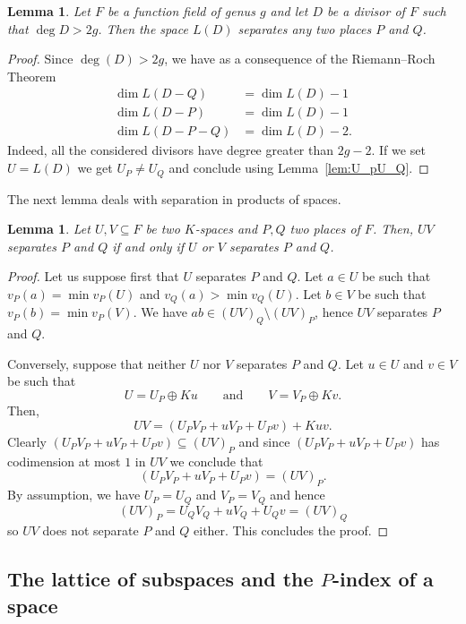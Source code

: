 \documentclass[10pt]{amsart}
\newtheorem{lemm}[theo]{Lemma}
\theoremstyle{definition}
\theoremstyle{remark}
\begin{document}
\begin{lemm}\label{lem:L(D)sep}
Let $F$ be a function field of genus $g$ and let $D$ be a divisor of $F$ such that $\deg D > 2g$. Then the space $L(D)$ separates any two places $P$ and $Q$.
\end{lemm}

\begin{proof}
Since $\deg (D) > 2g$, we have as a consequence of the Riemann--Roch Theorem
\begin{align*}
\dim L(D-Q) &= \dim L(D)-1\\
\dim L(D-P) &= \dim L(D)-1\\
\dim L(D-P-Q) &= \dim L(D)-2.
\end{align*}
Indeed, all the considered divisors have degree greater than $2g-2$. If we set $U= L(D)$ we get $U_P \neq U_Q$ and conclude using Lemma~\ref{lem:U_pU_Q}.
\end{proof}

The next lemma deals with separation in products of spaces.

\begin{lemm}\label{lem:sep_products}
Let $U, V \subseteq F$ be two $K$-spaces and $P, Q$ two places of $F$. Then, $UV$ separates $P$ and $Q$ if and only if $U$ or $V$ separates $P$ and $Q$.
\end{lemm}

\begin{proof}
Let us suppose first that $U$ separates $P$ and $Q$.
Let $a \in U$ be such that $v_P(a)=\min v_P(U)$ and $v_Q(a) > \min v_Q(U)$. Let $b \in V$ be such that $v_P(b)=\min v_P(V)$. We have $ab \in (UV)_Q \setminus (UV)_P$, hence $UV$ separates $P$ and $Q$.

Conversely, suppose that neither $U$ nor $V$ separates $P$ and $Q$. Let $u \in U$ and $v\in V$ be such that
\[
U= U_P \oplus Ku \qquad \textrm{and} \qquad V= V_P \oplus Kv.
\]
Then,
\[
UV=(U_P V_P + uV_P + U_P v) + Kuv.
\]
Clearly $(U_P V_P + uV_P + U_P v) \subseteq {(UV)}_P$ and since $(U_P V_P + uV_P + U_P v)$ has codimension at most $1$ in $UV$ we conclude that
\[
(U_P V_P + uV_P + U_P v)={(UV)}_P.
\]
By assumption, we have $U_P= U_Q$ and $V_P= V_Q$ and hence
\[
{(UV)}_P= U_Q V_Q + u V_Q + U_Q v={(UV)}_Q
\]
so $UV$ does not separate $P$ and $Q$ either. This concludes the proof.
\end{proof}

\subsection{The lattice of subspaces and the \texorpdfstring{$P$}{P}-index of a space}\label{sec:Pindex}
\end{document}
